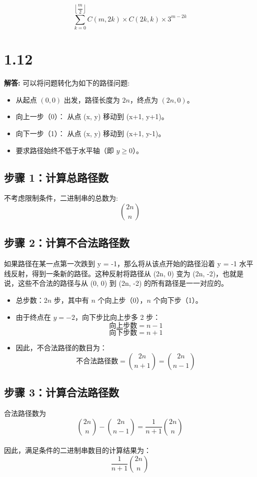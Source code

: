 \documentclass{article}
\begin{document}
\[
\boxed{\sum_{k=0}^{\left\lfloor \dfrac{m}{2} \right\rfloor} C(m, 2k) \times C(2k, k) \times 3^{m - 2k}}
\]

\section*{1.12}

\textbf{解答: }
可以将问题转化为如下的路径问题:

\begin{itemize}
    \item 从起点 $(0, 0)$ 出发，路径长度为 $2n$，终点为 $(2n, 0)$。
    \item 向上一步（0）： 从点 (x, y) 移动到 (x+1, y+1)。
    \item 向下一步（1）： 从点 (x, y) 移动到 (x+1, y-1)。
    \item 要求路径始终不低于水平轴（即 $y \geq 0$）。
\end{itemize}

\subsection*{步骤 1：计算总路径数}
不考虑限制条件，二进制串的总数为:
\[
\binom{2n}{n}
\]

\subsection*{步骤 2：计算不合法路径数}

如果路径在某一点第一次跌到 y = -1，那么将从该点开始的路径沿着 y = -1 水平线反射，得到一条新的路径。这种反射将路径从 (2n, 0) 变为 (2n, -2)，也就是说，这些不合法的路径与从 (0, 0) 到 (2n, -2) 的所有路径是一一对应的。
\begin{itemize}
    \item 总步数：$2n$ 步，其中有 $n$ 个向上步（0），$n$ 个向下步（1）。
    
    \item 由于终点在 $y = -2$，向下步比向上步多 2 步：
    \[
    \text{向上步数} = n - 1
    \]
    \[
    \text{向下步数} = n + 1
    \]

    \item 因此，不合法路径的数目为：
    \[
    \text{不合法路径数} = \binom{2n}{n + 1} = \binom{2n}{n - 1}
    \]
\end{itemize}

\subsection*{步骤 3：计算合法路径数}
合法路径数为
\[
\binom{2n}{n} - \binom{2n}{n-1} = \frac{1}{n + 1} \binom{2n}{n}
\]\\

因此，满足条件的二进制串数目的计算结果为：
\[
\boxed{\frac{1}{n + 1} \binom{2n}{n}}
\]
\end{document}
